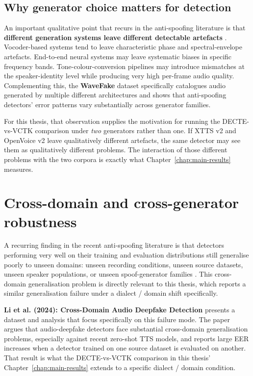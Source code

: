 \subsection{Why generator choice matters for detection}
\label{sec:background-generators-artefacts}

An important qualitative point that recurs in the anti-spoofing
literature is that \textbf{different generation systems leave
different detectable artefacts} \cite{Frank2021_WaveFake}.
Vocoder-based systems tend to leave characteristic phase and
spectral-envelope artefacts. End-to-end neural systems may leave
systematic biases in specific frequency bands. Tone-colour-conversion
pipelines may introduce mismatches at the speaker-identity level
while producing very high per-frame audio quality. Complementing
this, the \textbf{WaveFake} dataset \cite{Frank2021_WaveFake}
specifically catalogues audio generated by multiple different
architectures and shows that anti-spoofing detectors' error
patterns vary substantially across generator families.

For this thesis, that observation supplies the motivation for
running the DECTE-vs-VCTK comparison under \emph{two} generators
rather than one. If XTTS v2 and OpenVoice v2 leave qualitatively
different artefacts, the same detector may see them as
qualitatively different problems. The interaction of those
different problems with the two corpora is exactly what
Chapter~\ref{chap:main-results} measures.


\section{Cross-domain and cross-generator robustness}
\label{sec:background-cross-domain}

A recurring finding in the recent anti-spoofing literature is
that detectors performing very well on their training and
evaluation distributions still generalise poorly to unseen
domains: unseen recording conditions, unseen source datasets,
unseen speaker populations, or unseen spoof-generator families
\cite{Li2024_CrossDomainADD}. This cross-domain generalisation
problem is directly relevant to this thesis, which reports a
similar generalisation failure under a dialect / domain shift
specifically.

\textbf{Li et al. (2024): Cross-Domain Audio Deepfake Detection}
\cite{Li2024_CrossDomainADD} presents a dataset and analysis that
focus specifically on this failure mode. The paper argues that
audio-deepfake detectors face substantial cross-domain
generalisation problems, especially against recent zero-shot TTS
models, and reports large EER increases when a detector trained
on one source dataset is evaluated on another. That result is
what the DECTE-vs-VCTK comparison in this thesis'
Chapter~\ref{chap:main-results} extends to a specific
dialect / domain condition.

